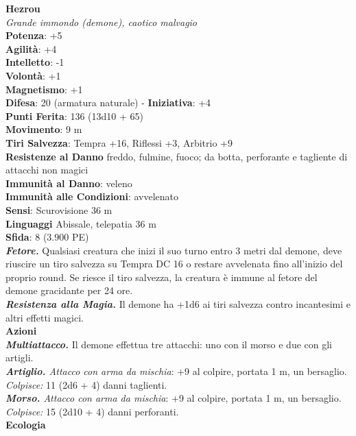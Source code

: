 \begin{multicols}{2}
\medskip\textbf{Hezrou}\\
\emph{Grande immondo (demone), caotico malvagio}\\
\textbf{Potenza}: +5\\
\textbf{Agilità}: +4\\
\textbf{Intelletto}: -1\\
\textbf{Volontà}: +1\\
\textbf{Magnetismo}: +1\\
\textbf{Difesa}: 20 (armatura naturale) - \textbf{Iniziativa}: +4\\
\textbf{Punti Ferita}: 136 (13d10 + 65)\\
\textbf{Movimento}: 9 m\\
\textbf{Tiri Salvezza}: Tempra +16, Riflessi +3, Arbitrio +9\\
\textbf{Resistenze al Danno} freddo, fulmine, fuoco; da botta, perforante e tagliente di attacchi non magici\\
\textbf{Immunità al Danno}: veleno\\
\textbf{Immunità alle Condizioni}: avvelenato\\
\textbf{Sensi}: Scurovisione 36 m\\
\textbf{Linguaggi} Abissale, telepatia 36 m \\
\textbf{Sfida}: 8 (3.900 PE)\smallskip\\
\emph{\textbf{Fetore.}} Qualsiasi creatura che inizi il suo turno entro 3 metri dal demone, deve riuscire un tiro salvezza su Tempra DC  16 o restare avvelenata fino all'inizio del proprio round. Se riesce il tiro salvezza, la creatura è immune al fetore del demone gracidante per 24 ore.\\
\emph{\textbf{Resistenza alla Magia.}} Il demone ha +1d6 ai tiri salvezza contro incantesimi e altri effetti magici.\\
\smallskip\textbf{Azioni}\\
\emph{\textbf{Multiattacco.}} Il demone effettua tre attacchi: uno con il morso e due con gli artigli.\\
\emph{\textbf{Artiglio.} Attacco con arma da mischia}: +9 al colpire, portata 1 m, un bersaglio.\\
\emph{Colpisce:} 11 (2d6 + 4) danni taglienti. \\
\emph{\textbf{Morso.} Attacco con arma da mischia}: +9 al colpire, portata 1 m, un bersaglio.\\
\emph{Colpisce:} 15 (2d10 + 4) danni perforanti.\\
\textbf{Ecologia}\\

\end{multicols}
